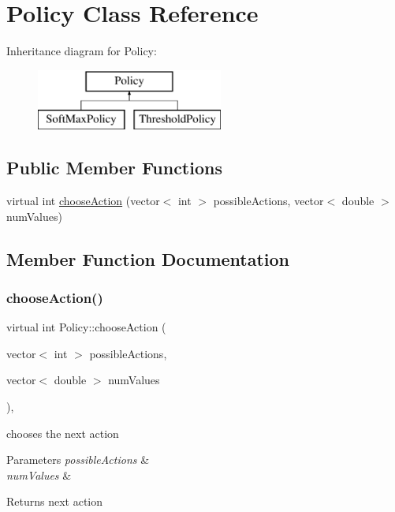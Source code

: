 \hypertarget{class_policy}{}\section{Policy Class Reference}
\label{class_policy}
Inheritance diagram for Policy\+:\begin{figure}[H]
\begin{center}
\leavevmode
\includegraphics[height=2.000000cm]{class_policy}
\end{center}
\end{figure}
\subsection*{Public Member Functions}
\begin{DoxyCompactItemize}
\item 
virtual int \mbox{\hyperlink{class_policy_a7afb2eee3c77b96a58d992acb4e0e1a8}{choose\+Action}} (vector$<$ int $>$ possible\+Actions, vector$<$ double $>$ num\+Values)
\end{DoxyCompactItemize}


\subsection{Member Function Documentation}
\mbox{\label{class_policy_a7afb2eee3c77b96a58d992acb4e0e1a8}} 
\subsubsection{\texorpdfstring{choose\+Action()}{chooseAction()}}
{\footnotesize\ttfamily virtual int Policy\+::choose\+Action (\begin{DoxyParamCaption}\item[{vector$<$ int $>$}]{possible\+Actions,  }\item[{vector$<$ double $>$}]{num\+Values }\end{DoxyParamCaption})\hspace{0.3cm}{\ttfamily [inline]}, {\ttfamily [virtual]}}

chooses the next action 
\begin{DoxyParams}{Parameters}
{\em possible\+Actions} & \\
\hline
{\em num\+Values} & \\
\hline
\end{DoxyParams}
\begin{DoxyReturn}{Returns}
next action 
\end{DoxyReturn}


